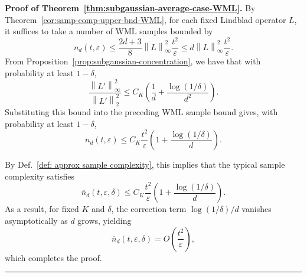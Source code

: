 \documentclass[superscriptaddress,amsmath,amssymb,aps,pra,letterpaper,tightenlines,notitlepages,12pt]{revtex4-2}
\newenvironment{proof}[1][Proof]{\noindent\textbf{#1.} }{\ \rule{0.5em}{0.5em}}
\begin{document}
\begin{proof}[Proof of Theorem~\ref{thm:subgaussian-average-case-WML}]
By Theorem~\ref{cor:samp-comp-upper-bnd-WML}, for each fixed Lindblad operator $L$, it suffices to take a number of WML samples bounded by
\begin{equation}
    n_d(t,\varepsilon)
    \le
    \frac{2d+3}{8}
    \left\|L\right\|_\infty^2
    \frac{t^2}{\varepsilon}
    \le
    d\left\|L\right\|_\infty^2
    \frac{t^2}{\varepsilon}.
\end{equation}
From Proposition~\ref{prop:subgaussian-concentration}, we have that with probability at least $1-\delta$,
\begin{equation}
\frac{\left\|L'\right\|_\infty^2}{\left\|L'\right\|_2^2} \le
C_K \left( \frac{1}{d} + \frac{\log(1/\delta)}{d^2} \right).
\end{equation}
Substituting this bound into the preceding WML sample bound gives, with probability at least $1-\delta$,
\begin{equation}
n_d(t,\varepsilon) \le C_K \frac{t^2}{\varepsilon}
\left( 1 + \frac{\log(1/\delta)}{d} \right).
\end{equation}

By Def.~\ref{def: approx sample complexity}, this implies that the typical sample complexity satisfies
\begin{equation}
\overline{n}_d(t,\varepsilon,\delta)
\le C_K \frac{t^2}{\varepsilon} \left( 1 + \frac{\log(1/\delta)}{d} \right).
\end{equation}
As a result, for fixed $K$ and $\delta$, the correction term $\log(1/\delta)/d$ vanishes asymptotically as $d$ grows, yielding
\begin{equation}
\overline{n}_d(t,\varepsilon,\delta) = O\!\left(\frac{t^2}{\varepsilon}\right),
\end{equation}
which completes the proof.
\end{proof}

\medskip
\end{document}
